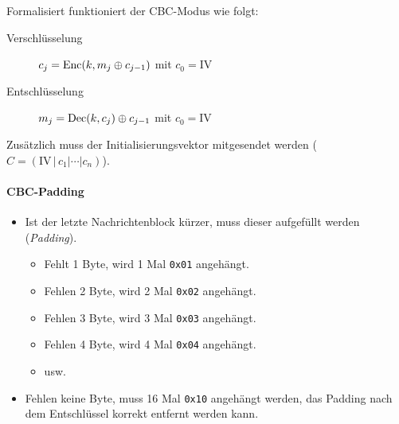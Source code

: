 					Formalisiert funktioniert der CBC-Modus wie folgt:
					\begin{description}
						\item[Verschlüsselung] \( c_j = \operatorname{Enc}(k, m_j \oplus c_{j - 1}) \) mit \( c_0 = \text{IV} \)
						\item[Entschlüsselung] \( m_j = \operatorname{Dec}(k, c_j) \oplus c_{j - 1} \) mit \(c_0 = \text{IV}\)
					\end{description}
					Zusätzlich muss der Initialisierungsvektor mitgesendet werden (\( C = (\text{IV} \,\vert\, c_1 \vert \cdots \vert c_n) \)).

				\paragraph{CBC-Padding}
					\begin{itemize}
						\item Ist der letzte Nachrichtenblock kürzer, muss dieser aufgefüllt werden (\textit{Padding}).
							\begin{itemize}
								\item Fehlt 1 Byte, wird 1 Mal \texttt{0x01} angehängt.
								\item Fehlen 2 Byte, wird 2 Mal \texttt{0x02} angehängt.
								\item Fehlen 3 Byte, wird 3 Mal \texttt{0x03} angehängt.
								\item Fehlen 4 Byte, wird 4 Mal \texttt{0x04} angehängt.
								\item usw.
							\end{itemize}
						\item Fehlen keine Byte, muss 16 Mal \texttt{0x10} angehängt werden, das Padding nach dem Entschlüssel korrekt entfernt werden kann.
					\end{itemize}

